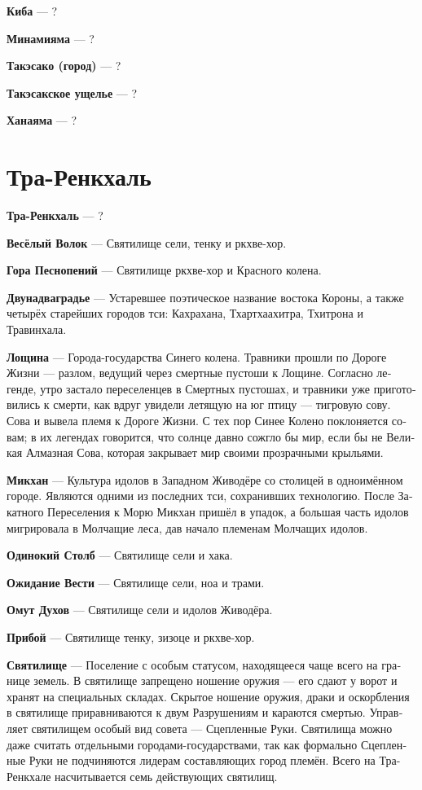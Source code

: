 \documentclass[a4paper,12pt,fleqn]{book}\usepackage{polyglossia}\setdefaultlanguage[babelshorthands=true]{russian}\setotherlanguage{english}\defaultfontfeatures{Ligatures=TeX,Mapping=tex-text}\usepackage{xcolor}\newcommand{\ml}[3]{#2}
\newcommand{\asterism}{\vspace{1em}{\centering\Large\bfseries$\ast~\ast~\ast$\par}\vspace{1em}}
\newcommand{\theterm}[3]{\textbf{\hypertarget{#1}{#2}} --- #3}
\begin{document}
\theterm{kiba}
{Киба}
{?}

\theterm{minamiyama}
{Минамияма}
{?}

\theterm{takesako-city}
{Такэсако (город)}
{?}

\theterm{takesako-dale}
{Такэсакское ущелье}
{?}

\theterm{hanayama}
{Ханаяма}
{?}

\section{Тра-Ренкхаль}

\theterm{tra-renkchal}
{Тра-Ренкхаль}
{?}

\asterism

\theterm{sanct3}
{Весёлый Волок}
{Святилище сели, тенку и ркхве-хор.}

\theterm{sanct6}
{Гора Песнопений}
{Святилище ркхве-хор и Красного колена.}

\theterm{two-and-two-cities}
{Двунадваградье}
{Устаревшее поэтическое название востока Короны, а также четырёх старейших городов тси: Кахрахана, Тхартхаахитра, Тхитрона и Травинхала.}

\theterm{deepdale}
{Лощина}
{Города-государства Синего колена.
Травники прошли по Дороге Жизни --- разлом, ведущий через смертные пустоши к Лощине.
Согласно легенде, утро застало переселенцев в Смертных пустошах, и травники уже приготовились к смерти, как вдруг увидели летящую на юг птицу --- тигровую сову.
Сова и вывела племя к Дороге Жизни.
С тех пор Синее Колено поклоняется совам;
в их легендах говорится, что солнце давно сожгло бы мир, если бы не Великая Алмазная Сова, которая закрывает мир своими прозрачными крыльями.}

\theterm{mikchan}
{Микхан}
{Культура идолов в Западном Живодёре со столицей в одноимённом городе.
Являются одними из последних тси, сохранивших технологию.
После Закатного Переселения к Морю Микхан пришёл в упадок, а большая часть идолов мигрировала в Молчащие леса, дав начало племенам Молчащих идолов.}

\theterm{sanct4}
{Одинокий Столб}
{Святилище сели и хака.}

\theterm{sanct5}
{Ожидание Вести}
{Святилище сели, ноа и трами.}

\theterm{sanct1}
{Омут Духов}
{Святилище сели и идолов Живодёра.}

\theterm{sanct7}
{Прибой}
{Святилище тенку, зизоце и ркхве-хор.}

\theterm{sanctuary}
{Святилище}
{Поселение с особым статусом, находящееся чаще всего на границе земель.
В святилище запрещено ношение оружия --- его сдают у ворот и хранят на специальных складах.
Скрытое ношение оружия, драки и оскорбления в святилище приравниваются к двум Разрушениям и караются смертью.
Управляет святилищем особый вид совета --- Сцепленные Руки.
Святилища можно даже считать отдельными городами-государствами, так как формально Сцепленные Руки не подчиняются лидерам составляющих город племён.
Всего на Тра-Ренкхале насчитывается семь действующих святилищ.}
\end{document}
